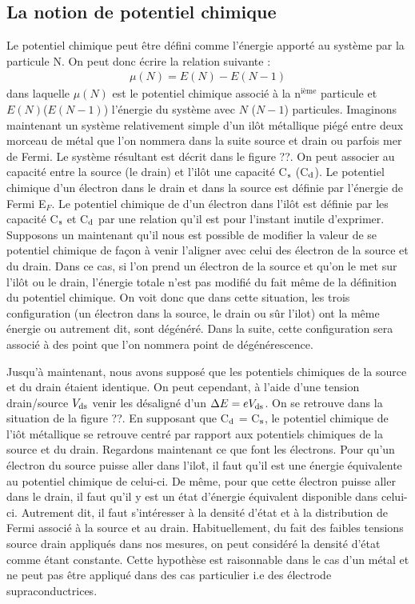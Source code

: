 \subsection{La notion de potentiel chimique}
Le potentiel chimique peut être défini comme l'énergie apporté au système par la particule N. On peut donc écrire la relation suivante :
\begin{eqnarray}
\mu(N) = E(N) - E(N-1)
\end{eqnarray}
dans laquelle $\mu (N)$ est le potentiel chimique associé à la n$^{\text{ième}}$ particule et  $E(N)$($E(N-1)$) l'énergie du système avec $N$ ($N-1$) particules. Imaginons maintenant un système relativement simple d'un il\^ot métallique piégé entre deux morceau de métal que l'on nommera dans la suite source et drain ou parfois mer de Fermi. Le système résultant est décrit dans le figure ??. On peut associer au capacité entre la source (le drain) et l'il\^ot une capacité C$_{\rm{s}}$ (C$_{\rm{d}}$). Le potentiel chimique d'un électron dans le drain et dans la source est définie par l'énergie de Fermi E$_F$. Le potentiel chimique de d'un électron dans l'il\^ot est définie par les capacité C$_{\rm{s}}$ et C$_{\rm{d}}$ par une relation qu'il est pour l'instant inutile d'exprimer. Supposons un maintenant qu'il nous est possible de modifier la valeur de se potentiel chimique de façon à venir l'aligner avec celui des électron de la source et du drain. Dans ce cas, si l'on prend un électron de la source et qu'on le met sur l'il\^ot ou le drain, l'énergie totale n'est pas modifié du fait m\^eme de la définition du potentiel chimique. On voit donc que dans cette situation, les trois configuration (un électron dans la source, le drain ou s\^ur l'ilot) ont la m\^eme énergie ou autrement dit, sont dégénéré. Dans la suite, cette configuration sera associé à des point que l'on nommera point de dégénérescence.


Jusqu'à maintenant, nous avons supposé que les potentiels chimiques de la source et du drain étaient identique. On peut cependant, à l'aide d'une tension drain/source $V_{\rm{ds}}$ venir les désaligné d'un $\Delta E = eV_{\rm{ds}}$. On se retrouve dans la situation de la figure ??. En supposant que C$_{\rm{d}}$ = C$_{\rm{s}}$, le potentiel chimique de l'i\^ot métallique se retrouve centré par rapport aux potentiels chimiques de la source et du drain. Regardons maintenant ce que font les électrons. Pour qu'un électron du source puisse aller dans l'ilo\^t, il faut qu'il est une énergie équivalente au potentiel chimique de celui-ci. De m\^eme, pour que cette électron puisse aller dans le drain, il faut qu'il y est un état d'énergie équivalent disponible dans celui-ci. Autrement dit, il faut s'intéresser à la densité d'état et à la distribution de Fermi associé à la source et au drain. Habituellement, du fait des faibles tensions source drain appliqués dans nos mesures, on peut considéré la densité d'état comme étant constante. Cette hypothèse est raisonnable dans le cas d'un métal et ne peut pas \^etre appliqué dans des cas particulier i.e des électrode supraconductrices.


